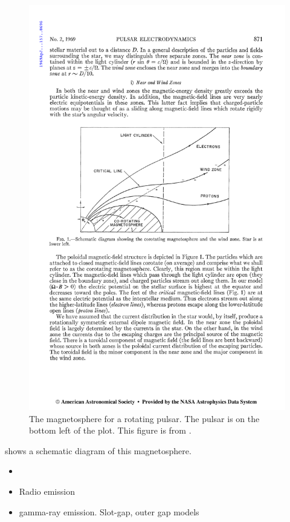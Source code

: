 \begin{figure}[htpb]
  \begin{center}
    \includegraphics{chapters/pulsar_pwn_system/figures/pulsar_magnetosphere.pdf}
  \end{center}
  \caption{The magnetosphere for a rotating pulsar.
  The pulsar is on the bottom left of the plot. This figure is
  from \cite{goldreich_1969_pulsar-electrodynamics}.}
\end{figure}

 shows a schematic diagram of this
magnetosphere.

\begin{itemize}
  \item
  \item Radio emission
  \item gamma-ray emission. Slot-gap, outer gap models
\end{itemize}


